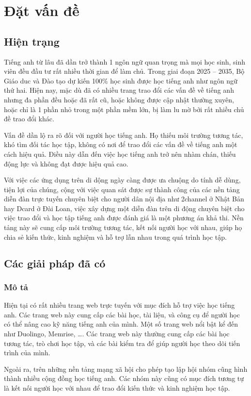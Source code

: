 \documentclass{uetgraduation}
\begin{document}
\chapter{Đặt vấn đề}\label{ch:dat-van-de}

\section{Hiện trạng}
Tiếng anh từ lâu đã dần trở thành 1 ngôn
 ngữ quan trọng mà mọi học sinh, sinh viên 
 đều đầu tư rất nhiều thời gian để làm chủ.
 Trong giai đoạn 2025 -- 2035, Bộ Giáo duc và
 Đào tạo dự kiến 100\% học sinh được học tiếng anh
 như ngôn ngữ thứ hai. Hiện nay, 
mặc dù đã có nhiều trang trao đổi các vấn
 đề về tiếng anh nhưng đa phần đều hoặc đã rất
  cũ, hoặc không được cập nhật
 thường xuyên, hoặc chỉ là 1 phần nhỏ trong 
 một phần mềm lớn, bị làm lu mờ bởi rất nhiều chủ đề trao đổi khác.\par
 Vấn đề dần lộ ra rõ đối với người học tiếng anh. Họ thiếu môi trường tương tác, 
 khó tìm đối tác học tập, không có nơi để trao đổi các vấn đề về tiếng 
 anh một cách hiệu quả.
  Điều này dẫn đến việc học tiếng anh trở nên nhàm chán, 
  thiếu động lực và không đạt được hiệu quả cao.\par
  Với việc các ứng dụng trên di dộng ngày càng được ưa chuộng do tính
  dễ dùng, tiện lợi của chúng, cộng với việc quan sát được sự thành công của 
  các nền tảng diễn đàn trực tuyến chuyên biệt cho người dân
  nội địa như 2channel\cite{2chan} ở Nhật Bản hay Dcard\cite{Dcard} ở Đài Loan, việc xây 
  dựng một diễn đàn trên di động chuyên
  biệt cho việc trao đổi và học tập tiếng anh được đánh giá là một phương án
   khả thi. Nền tảng này sẽ cung cấp môi trường tương tác, kết nối người học với nhau, giúp họ chia sẻ kiến thức, kinh nghiệm và hỗ trợ lẫn nhau trong quá trình học tập.
\section{Các giải pháp đã có}

\subsection{Mô tả}
Hiện tại có rất nhiều trang web trực tuyến với mục đích hỗ trợ việc học tiếng anh. 
Các trang web này cung cấp các bài học, tài liệu, và công cụ để người học có thể nâng cao kỹ năng tiếng anh của mình.
 Một số trang web nổi bật kể đến như Duolingo, Memrise, \ldots. Các 
 trang web này thường cung cấp các bài học tương tác, trò chơi học tập, và các bài kiểm tra để giúp người học theo dõi tiến trình của mình.\par
 Ngoài ra, trên những nền tảng mạng xã hội cho phép tạo lập hội nhóm cũng hình
 thành nhiều cộng đồng học tiếng anh. Các nhóm này cũng có mục đích tương tự là kết nối người học với nhau để trao đổi kiến thức và kinh nghiệm học tập.
\end{document}
